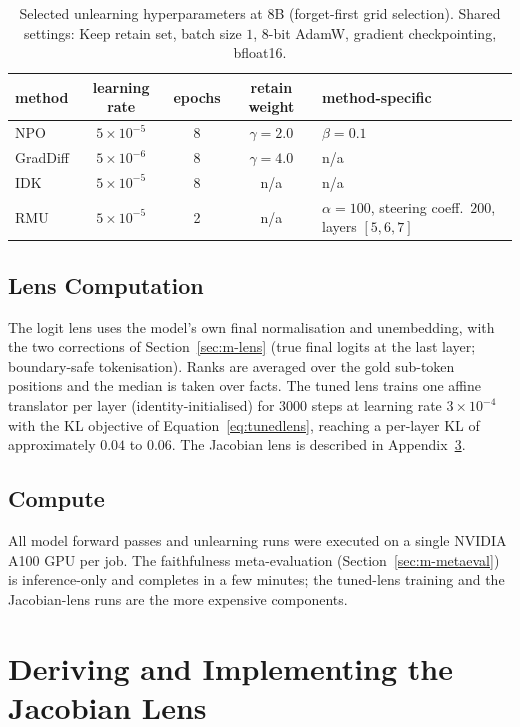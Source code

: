 \begin{table}[t]
  \centering
  \caption[Selected unlearning hyperparameters (8B)]{Selected unlearning hyperparameters at 8B
  (forget-first grid selection). Shared settings: Keep retain set, batch size $1$, 8-bit AdamW, gradient
  checkpointing, bfloat16.}
  \label{tab:hp}
  \begin{tabular}{lcccl}
    \toprule
    method & learning rate & epochs & retain weight & method-specific \\
    \midrule
    NPO      & $5\times10^{-5}$ & 8 & $\gamma=2.0$ & $\beta=0.1$ \\
    GradDiff & $5\times10^{-6}$ & 8 & $\gamma=4.0$ & n/a \\
    IDK      & $5\times10^{-5}$ & 8 & n/a          & n/a \\
    RMU      & $5\times10^{-5}$ & 2 & n/a          & $\alpha=100$, steering coeff.\ $200$, layers $[5,6,7]$ \\
    \bottomrule
  \end{tabular}
\end{table}

\section{Lens Computation}
The logit lens uses the model's own final normalisation and unembedding, with the two corrections of
Section~\ref{sec:m-lens} (true final logits at the last layer; boundary-safe tokenisation). Ranks are
averaged over the gold sub-token positions and the median is taken over facts. The tuned lens trains one
affine translator per layer (identity-initialised) for $3000$ steps at learning rate $3\times10^{-4}$ with
the KL objective of Equation~\eqref{eq:tunedlens}, reaching a per-layer KL of approximately $0.04$ to $0.06$.
The Jacobian lens is described in Appendix~\ref{app:jacobian}.

\section{Compute}
All model forward passes and unlearning runs were executed on a single NVIDIA A100 GPU per job. The
faithfulness meta-evaluation (Section~\ref{sec:m-metaeval}) is inference-only and completes in a few
minutes; the tuned-lens training and the Jacobian-lens runs are the more expensive components.


\chapter{Deriving and Implementing the Jacobian Lens}
\label{app:jacobian}

